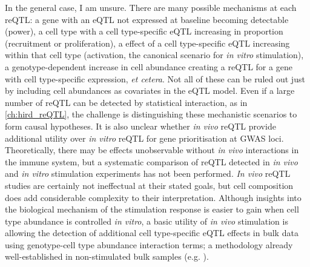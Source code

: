 In the general case, I am unsure.
There are many possible mechanisms at each \gls{reQTL}:
a gene with an \gls{eQTL} not expressed at baseline becoming detectable (power),
a cell type with a cell type-specific \gls{eQTL} increasing in proportion (recruitment or proliferation),
a effect of a cell type-specific \gls{eQTL} increasing within that cell type (activation, the canonical scenario for \textit{in vitro} stimulation),
a genotype-dependent increase in cell abundance creating a \gls{reQTL} for a gene with cell type-specific expression,
\textit{et cetera}.
Not all of these can be ruled out just by including cell abundances as covariates in the \gls{eQTL} model.
Even if a large number of \gls{reQTL} can be detected by statistical interaction, as in \cref{ch:hird_reQTL},
the challenge is distinguishing these mechanistic scenarios to form causal hypotheses.
It is also unclear whether \textit{in vivo} \gls{reQTL} provide additional utility over \textit{in vitro} \gls{reQTL} for gene prioritisation at \gls{GWAS} loci.
Theoretically, there may be effects unobservable without \textit{in vivo} interactions in the immune system, 
but a systematic comparison of \gls{reQTL} detected in \textit{in vivo} and \textit{in vitro} stimulation experiments has not been performed.
\textit{In vivo} \gls{reQTL} studies are certainly not ineffectual at their stated goals, 
but cell composition does add considerable complexity to their interpretation.
Although insights into the biological mechanism of the stimulation response is easier to gain when cell type abundance is controlled \textit{in vitro},
a basic utility of \textit{in vivo} stimulation is allowing the detection of additional cell type-specific \gls{eQTL} effects in bulk data using genotype-cell type abundance interaction terms;
a methodology already well-established in non-stimulated bulk samples (e.g. \autocite{westra2015CellSpecificEQTL}).

